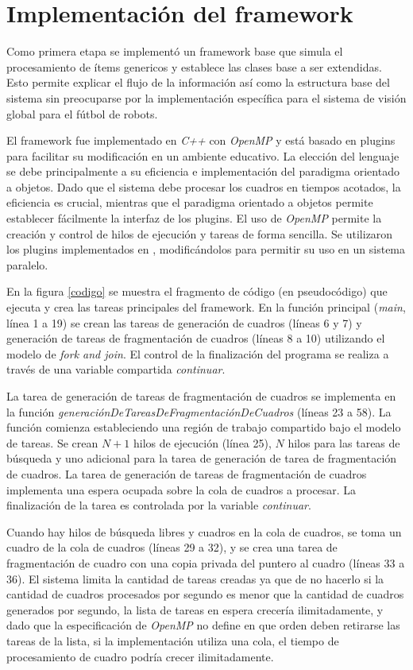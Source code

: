 \section{Implementación del framework}

\label{implementacionFramework}

Como primera etapa se implementó un framework base que simula el procesamiento de
ítems genericos y establece las clases base a ser extendidas. Esto permite
explicar el flujo de la información así como la estructura base del sistema sin
preocuparse por la implementación específica para el sistema de visión global
para el fútbol de robots.

El framework fue implementado en \emph{C++} con \emph{OpenMP} y está basado en
plugins para facilitar su modificación en un ambiente educativo. La elección del
lenguaje se debe principalmente a su eficiencia e implementación del paradigma
orientado a objetos. Dado que el sistema debe procesar los cuadros en tiempos
acotados, la eficiencia es crucial, mientras que el paradigma orientado a
objetos permite establecer fácilmente la interfaz de los plugins. El uso de
\emph{OpenMP} permite la creación y control de hilos de ejecución y tareas de
forma sencilla. Se utilizaron los plugins implementados en \cite{torres2014},
modificándolos para permitir su uso en un sistema paralelo.

En la figura \ref{codigo} se muestra el fragmento de código (en pseudocódigo)
que ejecuta y crea las tareas principales del framework. En la función principal
(\emph{main}, línea 1 a 19) se crean las tareas de generación de cuadros (líneas
6 y 7) y generación de tareas de fragmentación de cuadros (líneas 8 a 10)
utilizando el modelo de \emph{fork and join}. El control de la finalización del
programa se realiza a través de una variable compartida \emph{continuar}.

La tarea de generación de tareas de fragmentación de cuadros se implementa en la
función \emph{generaciónDeTareasDeFragmentaciónDeCuadros} (líneas 23 a 58). La
función comienza estableciendo una región de trabajo compartido bajo el modelo
de tareas. Se crean $N+1$ hilos de ejecución (línea 25), $N$ hilos para las
tareas de búsqueda y uno adicional para la tarea de generación de tarea de
fragmentación de cuadros. La tarea de generación de tareas de fragmentación de
cuadros implementa una espera ocupada sobre la cola de cuadros a procesar. La
finalización de la tarea es controlada por la variable \emph{continuar}.

Cuando hay hilos de búsqueda libres y cuadros en la cola de cuadros, se toma un
cuadro de la cola de cuadros (líneas 29 a 32), y se crea una tarea de
fragmentación de cuadro con una copia privada del puntero al cuadro (líneas 33 a
36). El sistema limita la cantidad de tareas creadas ya que de no hacerlo si la
cantidad de cuadros procesados por segundo es menor que la cantidad de cuadros
generados por segundo, la lista de tareas en espera crecería ilimitadamente, y
dado que la especificación de \emph{OpenMP} no define en que orden deben
retirarse las tareas de la lista, si la implementación utiliza una cola, el
tiempo de procesamiento de cuadro podría crecer ilimitadamente.

